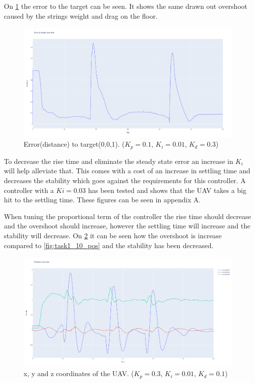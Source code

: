 \documentclass[conference]{IEEEtran}
\begin{document}
On \cref{fig:task1_11_err} the error to the target can be seen. It shows the same drawn out overshoot caused by the strings weight and drag on the floor.

\begin{figure}[hbtp]
	\centering
	\includegraphics[width=1.0\linewidth]{images/task1_11_err.png}
	\caption{Error(distance) to target(0,0,1). ($K_p = 0.1$, $K_i = 0.01$, $K_d = 0.3$)}
	\label{fig:task1_11_err}
\end{figure}

To decrease the rise time and eliminate the steady state error an increase in $K_i$ will help alleviate that. This comes with a cost of an increase in settling time and decreases the stability which goes against the requirements for this controller. A controller with a $Ki=0.03$ has been tested and shows that the UAV takes a big hit to the settling time. These figures can be seen in appendix A.

When tuning the proportional term of the controller the rise time should decrease and the overshoot should increase, however the settling time will increase and the stability will decrease. On \cref{fig:task1_4_pos} it can be seen how the overshoot is increase compared to \cref{fig:task1_10_pos} and the stability has been decreased. 

\begin{figure}[hbtp]
	\centering
	\includegraphics[width=1.0\linewidth]{images/task1_4_pos.png}
	\caption{x, y and z coordinates of the UAV. ($K_p = 0.3$, $K_i = 0.01$, $K_d = 0.1$)}
	\label{fig:task1_4_pos}
\end{figure}
\end{document}
